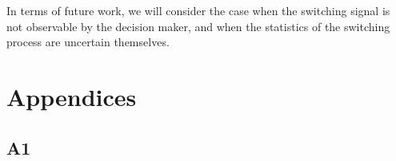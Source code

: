 \documentclass[letterpaper,11pt]{article}
\begin{document}
In terms of future work, we will consider the case when 
the switching signal is not observable by the decision maker,
and when the statistics of the switching process are uncertain themselves. 




%




\section{Appendices}

\subsection*{A1}
\end{document}
